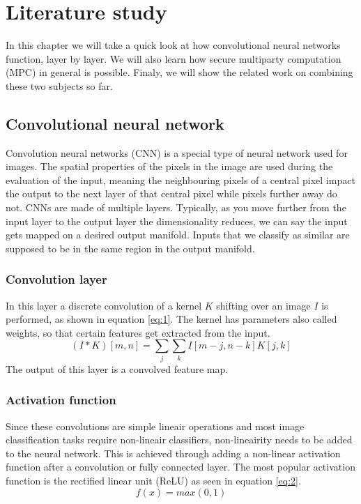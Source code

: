 
\chapter{Literature study}
In this chapter we will take a quick look at how convolutional neural networks function, layer by layer. We will also learn how secure multiparty computation (MPC) in general is possible. Finaly, we will show the related work on combining these two subjects so far.

\section{Convolutional neural network}
Convolution neural networks (CNN) is a special type of neural network used for images. The spatial properties of the pixels in the image are used during the evaluation of the input, meaning the neighbouring pixels of a central pixel impact the output to the next layer of that central pixel while pixels further away do not.
CNNs are made of multiple layers. Typically, as you move further from the input layer to the output layer the dimensionality reduces, we can say the input gets mapped on a desired output manifold. Inputs that we classify as similar are supposed to be in the same region in the output manifold.

\subsection{Convolution layer}
In this layer a discrete convolution of a kernel $K$ shifting over an image $I$ is performed, as shown in equation \ref{eq:1}. The kernel has parameters also called weights, so that certain features get extracted from the input.
\begin{equation} \label{eq:1}
  (I*K)[m,n]=\sum_j\sum_k I[m-j,n-k]K[j,k]
\end{equation}
The output of this layer is a convolved feature map.

\subsection{Activation function}
Since these convolutions are simple lineair operations and most image classification tasks require non-lineair classifiers, non-lineairity needs to be added to the neural network. This is achieved through adding a non-linear activation function after a convolution or fully connected layer. The most popular activation function is the rectified linear unit (ReLU) as seen in equation \ref{eq:2}.
\begin{equation} \label{eq:2}
  f(x)=max(0,1)
\end{equation}

